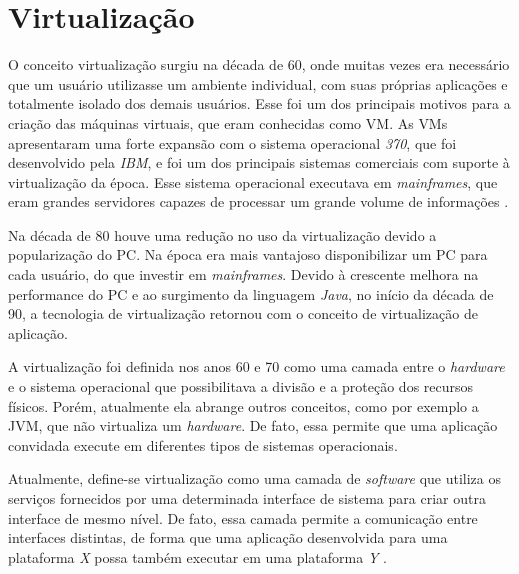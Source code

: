 \chapter{Virtualização}
\label{cap:virtualizacao}

O conceito virtualização surgiu na década de 60, onde muitas vezes era necessário que um usuário utilizasse um ambiente individual, 
com suas próprias aplicações e totalmente isolado dos demais usuários. Esse foi um dos principais motivos para a criação das máquinas 
virtuais, que eram conhecidas como \ac{VM}. As \ac{VM}s apresentaram uma forte expansão com o sistema operacional \textit{370}, que foi 
desenvolvido pela \textit{IBM}, e foi um dos principais sistemas comerciais com suporte à virtualização da época. Esse sistema operacional 
executava em \textit{mainframes}, que eram grandes servidores capazes de processar um grande volume de informações \cite{laureano2008}. 

Na década de 80 houve uma redução no uso da virtualização devido a popularização do \ac{PC}. Na época era mais vantajoso disponibilizar 
um \ac{PC} para cada usuário, do que investir em \textit{mainframes}. Devido à crescente melhora na performance do \ac{PC} e
ao surgimento da linguagem \textit{Java}, no início da década de 90, a tecnologia de virtualização retornou com o conceito de virtualização
de aplicação.

A virtualização foi definida nos anos 60 e 70 como uma camada entre o \textit{hardware} e o sistema operacional que possibilitava a 
divisão e a proteção dos recursos físicos. Porém, atualmente ela abrange outros conceitos, como por exemplo a \ac{JVM}, que não virtualiza
um \textit{hardware}. De fato, essa permite que uma aplicação convidada execute em diferentes tipos de sistemas operacionais.

Atualmente, define-se virtualização como uma camada de \textit{software} que utiliza os serviços fornecidos por uma determinada interface de 
sistema para criar outra interface de mesmo nível. De fato, essa camada permite a comunicação entre interfaces distintas, de forma que uma 
aplicação desenvolvida para uma plataforma \textit{X} possa também executar em uma plataforma \textit{Y} \cite{laureano2008}.

